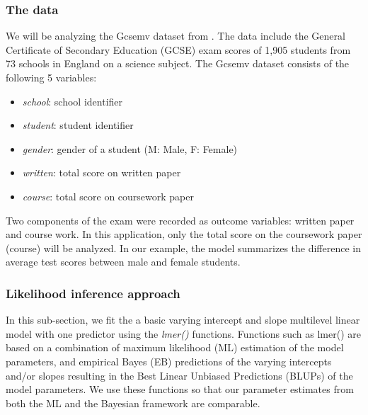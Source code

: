 \subsubsection{The data}
We will be analyzing the Gcsemv dataset from \cite{rasbash2000user}. The data include the General Certificate of Secondary Education (GCSE) exam scores of 1,905 students from 73 schools in England on a science subject. The Gcsemv dataset consists of the following 5 variables:
\begin{itemize}
	\item \textit{school}: school identifier
	\item \textit{student}: student identifier
	\item \textit{gender}: gender of a student (M: Male, F: Female)
	\item \textit{written}: total score on written paper
	\item \textit{course}: total score on coursework paper
\end{itemize}
Two components of the exam were recorded as outcome variables: written paper and course work. In this application, only the total score on the coursework paper (course) will be analyzed. In our example, the model summarizes the difference in average test scores between male and female students.

\subsubsection{Likelihood inference approach}
In this sub-section, we fit the a basic varying intercept and slope multilevel linear model with one predictor using the \textit{lmer()} functions. Functions such as lmer() are based on a combination of maximum likelihood (ML) estimation of the model parameters, and empirical Bayes (EB) predictions of the varying intercepts and/or slopes resulting in the Best Linear Unbiased Predictions (BLUPs) of the model parameters. We use these functions so that our parameter estimates from both the ML and the Bayesian framework are comparable.

